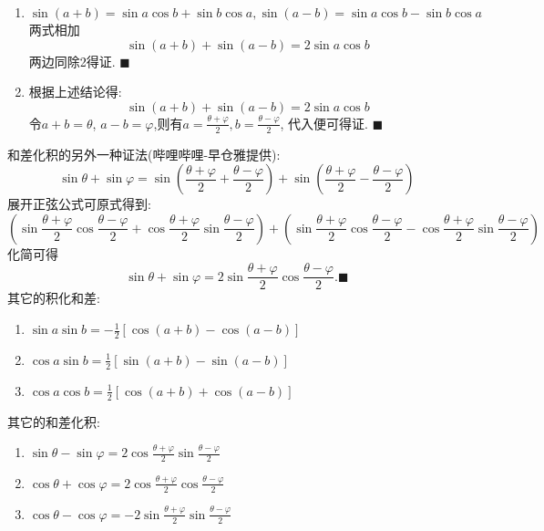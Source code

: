 \documentclass{book}
\begin{document}
    \begin{enumerate}
        \item $$\sin (a+b)=\sin a\cos b+\sin b \cos a, \sin (a-b)=\sin a\cos b-\sin b \cos a$$\textcolor[rgb]{0.75,0.17,0.22}{两式相加}$$\sin(a+b)+\sin(a-b)=2\sin a\cos b$$两边同除2得证. $\blacksquare$
        \item 根据上述结论得:$$\sin(a+b) +\sin(a-b)=2\sin a\cos b$$\textcolor[rgb]{0.75,0.17,0.22}{令$a+b=\theta$, $a-b=\varphi$,则有$\displaystyle a=\frac{\theta+\varphi}{2},b=\frac{\theta-\varphi}{2}$}, 代入便可得证. $\blacksquare$
    \end{enumerate}

    和差化积的另外一种证法(哔哩哔哩-早仓雅提供):
    $$
        \sin \theta + \sin \varphi =\sin \left( \frac{\theta+\varphi}{2}+ \frac{\theta -\varphi}{2} \right)+\sin \left( \frac{\theta+\varphi}{2}- \frac{\theta -\varphi}{2} \right)
    $$
    展开正弦公式可原式得到:
    $$
        \left( \sin \frac{\theta +\varphi}{2}\cos \frac{\theta -\varphi}{2}+\cos \frac{\theta +\varphi}{2}\sin \frac{\theta -\varphi}{2} \right)+\left( \sin \frac{\theta +\varphi}{2}\cos \frac{\theta -\varphi}{2}-\cos \frac{\theta +\varphi}{2}\sin \frac{\theta -\varphi}{2} \right)
    $$
    化简可得
    $$
        \sin \theta + \sin \varphi = 2\sin\frac{\theta+\varphi}{2}\cos\frac{\theta-\varphi}{2}.\blacksquare
    $$
    其它的\textcolor[rgb]{0.38,0.11,0.2}{积化和差}:
    \begin{enumerate}
        \item $\displaystyle \sin a\sin b=-\frac{1}{2}[\cos(a+b)-\cos(a-b)]$
        \item $\displaystyle \cos a\sin b=\frac{1}{2}[\sin(a+b)-\sin(a-b)]$
        \item $\displaystyle \cos a\cos b=\frac{1}{2}[\cos(a+b) +\cos(a-b)]$
    \end{enumerate}

    其它的\textcolor[rgb]{0.38,0.11,0.2}{和差化积}:

    \begin{enumerate}
        \item $\displaystyle \sin \theta-\sin \varphi=2\cos\frac{\theta+\varphi}{2}\sin\frac{\theta-\varphi}{2}$
        \item $\displaystyle \cos \theta+\cos \varphi=2\cos \frac{\theta+\varphi}{2} \cos \frac{\theta-\varphi}{2}$
        \item $\displaystyle \cos \theta-\cos \varphi=-2\sin \frac{\theta+\varphi}{2} \sin \frac{\theta-\varphi}{2}$
    \end{enumerate}
\end{document}
